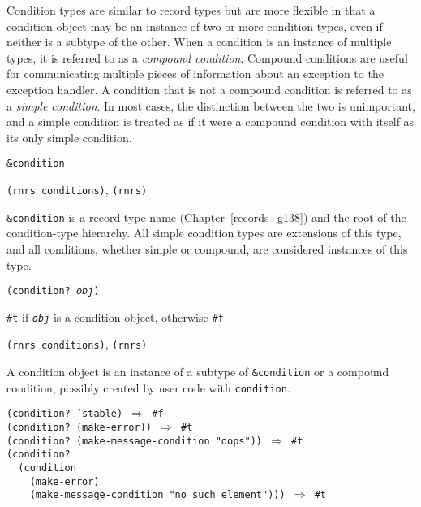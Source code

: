 \label{exceptions_s11}\label{exceptions_s12}Condition types are similar to record types but are more flexible in
that a condition object may be an instance of two or more condition
types, even if neither is a subtype of the other.
When a condition is an instance of multiple types, it is referred to
as a \textit{compound condition}.
Compound conditions are useful for communicating multiple pieces
of information about an exception to the exception handler.
A condition that is not a compound condition is referred to as a
\textit{simple condition}.
In most cases, the distinction between the two is unimportant, and
a simple condition is treated as if it were a compound condition
with itself as its only simple condition.

\begin{description}

\label{exceptions_s13}\item[syntax] \texttt{\&{}condition}



\item[libraries] \texttt{(rnrs conditions)}, \texttt{(rnrs)}
\end{description}

\texttt{\&{}condition} is a record-type name (Chapter \ref{records_g138}) and
the root of the condition-type hierarchy.
All simple condition types are extensions of this type, and all
conditions, whether simple or compound, are considered instances
of this type.
\begin{description}

\label{exceptions_s14}\item[procedure] \texttt{(condition? \textit{obj})}



\item[returns] \texttt{\#{}t} if \texttt{\textit{obj}} is a condition object, otherwise \texttt{\#{}f}


\item[libraries] \texttt{(rnrs conditions)}, \texttt{(rnrs)}
\end{description}


A condition object is an instance of a subtype of \texttt{\&{}condition}
or a compound condition, possibly created by user code with
\texttt{condition}.


\begin{alltt}
(condition? 'stable) \(\Rightarrow\) \#{}f
(condition? (make-error)) \(\Rightarrow\) \#{}t
(condition? (make-message-condition "oops")) \(\Rightarrow\) \#{}t
(condition?
  (condition
    (make-error)
    (make-message-condition "no such element"))) \(\Rightarrow\) \#{}t
\end{alltt}

